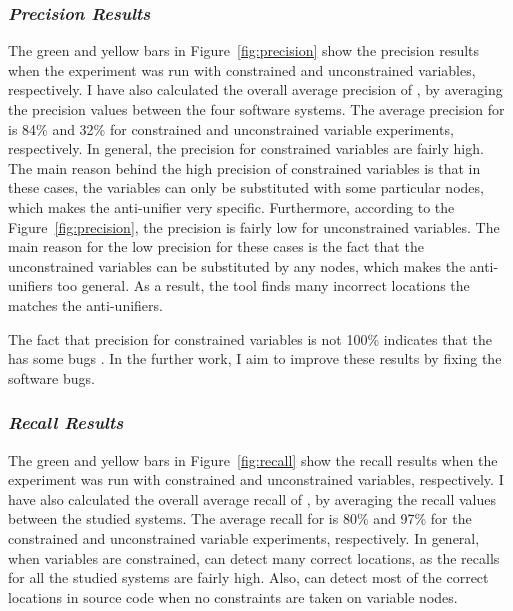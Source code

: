 \subsubsection{\emph{Precision Results}}  \label{precision-results}
The green and yellow bars in Figure~\ref{fig:precision}  show the precision results when the experiment was run with constrained and unconstrained variables, respectively. I have also calculated the overall average precision of , by averaging the precision values between the four software systems. The average precision for  is 84\% and 32\% for constrained and unconstrained variable experiments, respectively. In general, the precision for constrained variables are fairly high. The main reason behind the high precision of constrained variables is that in these cases, the variables can only be substituted with some particular nodes, which makes the anti-unifier very specific. Furthermore, according to the Figure~\ref{fig:precision}, the precision is fairly low for unconstrained variables. The main reason for the low precision for these cases is the fact that the unconstrained variables can be substituted by any nodes, which makes the anti-unifiers too general. As a result, the tool finds many incorrect locations the matches the anti-unifiers.

The fact that precision for constrained variables is not 100\% indicates that the  has some bugs . In the further work, I aim to improve these results by fixing the software bugs.


\subsubsection{\emph{Recall Results}}  \label{recall-results}
The green and yellow bars in Figure~\ref{fig:recall}  show the recall results when the experiment was run with constrained and unconstrained variables, respectively. I have also calculated the overall average recall of , by averaging the recall values between the studied systems. The average recall for  is 80\% and 97\% for the constrained and unconstrained variable experiments, respectively. In general, when variables are constrained,  can detect many correct locations, as the recalls for all the studied systems are fairly high. Also,  can detect most of the correct locations in source code when no constraints are taken on variable nodes.

